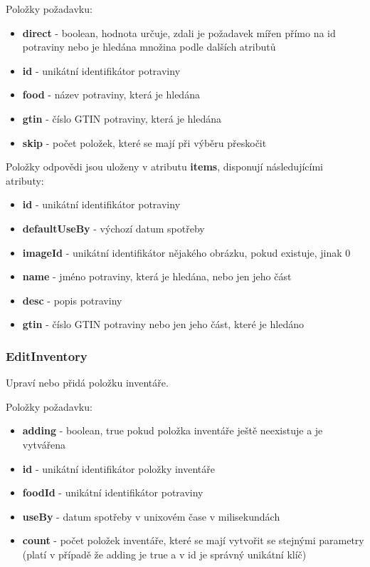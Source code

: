 \documentclass[thesis=B,czech]{FITthesis}[2013/10/20]
\begin{document}
Položky požadavku:
\begin{itemize}
  \item \textbf{direct} - boolean, hodnota určuje, zdali je požadavek mířen přímo na id potraviny nebo je hledána množina podle dalších atributů
  \item \textbf{id} - unikátní identifikátor potraviny
  \item \textbf{food} - název potraviny, která je hledána
  \item \textbf{gtin} - číslo GTIN potraviny, která je hledána
  \item \textbf{skip} - počet položek, které se mají při výběru přeskočit
\end{itemize}

Položky odpovědi jsou uloženy v atributu \textbf{items}, disponují následujícími atributy:
\begin{itemize}
  \item \textbf{id} - unikátní identifikátor potraviny
  \item \textbf{defaultUseBy} - výchozí datum spotřeby
  \item \textbf{imageId} - unikátní identifikátor nějakého obrázku, pokud existuje, jinak 0
  \item \textbf{name} - jméno potraviny, která je hledána, nebo jen jeho část
  \item \textbf{desc} - popis potraviny
  \item \textbf{gtin} - číslo GTIN potraviny nebo jen jeho část, které je hledáno
\end{itemize}


\subsubsection{EditInventory}
Upraví nebo přidá položku inventáře.

Položky požadavku:
\begin{itemize}
  \item \textbf{adding} - boolean, true pokud položka inventáře ještě neexistuje a je vytvářena
  \item \textbf{id} - unikátní identifikátor položky inventáře
  \item \textbf{foodId} - unikátní identifikátor potraviny
  \item \textbf{useBy} - datum spotřeby v unixovém čase v milisekundách
  \item \textbf{count} - počet položek inventáře, které se mají vytvořit se stejnými parametry (platí v případě že adding je true a v id je správný unikátní klíč)
\end{itemize}
\end{document}
